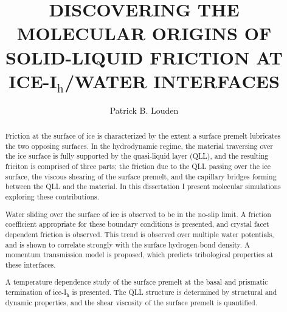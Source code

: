 \documentclass[noinfo,final,sort&compress]{nddiss2e}
\begin{document}
\frontmatter %

\title{DISCOVERING THE MOLECULAR ORIGINS OF SOLID-LIQUID FRICTION AT 
  ICE-I$_\mathrm{h}$/WATER INTERFACES}
\author{Patrick B. Louden}
\maketitle


\begin{abstract}
  Friction at the surface of ice is characterized by the extent a
  surface premelt lubricates the two opposing surfaces. In the
  hydrodynamic regime, the material traversing over the ice surface is
  fully supported by the quasi-liquid layer (QLL), and the resulting
  friciton is comprised of three parts; the friction due to the QLL
  passing over the ice surface, the viscous shearing of the surface
  premelt, and the capillary bridges forming between the QLL and the
  material. In this dissertation I present molecular simulations
  exploring these contributions. 

  Water sliding over the surface of ice is observed to be in the
  no-slip limit. A friction coefficient appropriate for these boundary
  conditions is presented, and crystal facet dependent friction is
  observed. This trend is observed over multiple water potentials, and
  is shown to correlate strongly with the surface hydrogen-bond
  density. A momentum transmission model is proposed, which predicts
  tribological properties at these interfaces.

  A temperature dependence study of the surface premelt at the basal
  and prismatic termination of ice-I$_\mathrm{h}$ is presented. The
  QLL structure is determined by structural and dynamic properties,
  and the shear viscosity of the surface premelt is quantified. 
\end{abstract}

\end{document}
